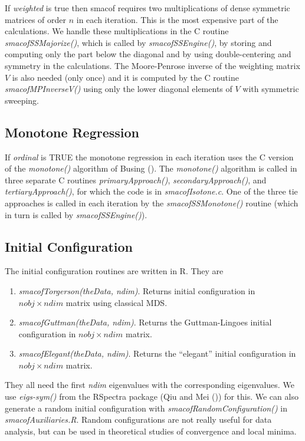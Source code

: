\documentclass[
  12pt,
  letterpaper,
  DIV=11,
  numbers=noendperiod]{scrartcl}
\providecommand{\tightlist}{%
  \setlength{\itemsep}{0pt}\setlength{\parskip}{0pt}}
\begin{document}
If \emph{weighted} is true then smacof requires two multiplications of
dense symmetric matrices of order \(n\) in each iteration. This is the
most expensive part of the calculations. We handle these multiplications
in the C routine \emph{smacofSSMajorize()}, which is called by
\emph{smacofSSEngine()}, by storing and computing only the part below
the diagonal and by using double-centering and symmetry in the
calculations. The Moore-Penrose inverse of the weighting matrix \(V\) is
also needed (only once) and it is computed by the C routine
\emph{smacofMPInverseV()} using only the lower diagonal elements of
\(V\) with symmetric sweeping.

\subsection{Monotone Regression}\label{sec-monotone}

If \emph{ordinal} is TRUE the monotone regression in each iteration uses
the C version of the \emph{monotone()} algorithm of Busing
(). The \emph{monotone()} algorithm is
called in three separate C routines \emph{primaryApproach()},
\emph{secondaryApproach()}, and \emph{tertiaryApproach()}, for which the
code is in \emph{smacofIsotone.c}. One of the three tie approaches is
called in each iteration by the \emph{smacofSSMonotone()} routine (which
in turn is called by \emph{smacofSSEngine()}).

\subsection{Initial Configuration}\label{sec-initial}

The initial configuration routines are written in R. They are

\begin{enumerate}
\def\labelenumi{\arabic{enumi}.}
\tightlist
\item
  \emph{smacofTorgerson(theData, ndim)}. Returns initial configuration
  in \(nobj \times ndim\) matrix using classical MDS.
\item
  \emph{smacofGuttman(theData, ndim)}. Returns the Guttman-Lingoes
  initial configuration in \(nobj \times ndim\) matrix.
\item
  \emph{smacofElegant(theData, ndim)}. Returns the ``elegant'' initial
  configuration in \(nobj \times ndim\) matrix.
\end{enumerate}

They all need the first \emph{ndim} eigenvalues with the corresponding
eigenvalues. We use \emph{eigs-sym()} from the RSpectra package (Qiu and
Mei ()) for this. We can also generate a
random initial configuration with \emph{smacofRandomConfiguration()} in
\emph{smacofAuxiliaries.R}. Random configurations are not really useful
for data analysis, but can be used in theoretical studies of convergence
and local minima.
\end{document}
